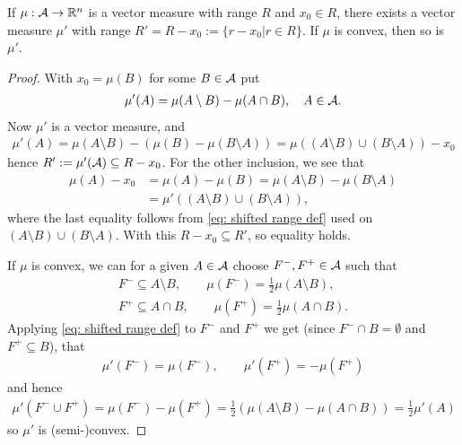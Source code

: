 \documentclass[../../main.tex]{subfiles}
\begin{document}
\begin{lemma}\label{lem: shifted measure}
If $\mu:\mathcal{A} \to \mathbb{R}^{n}$ is a vector measure with range $R$ and $x_{0}\in R$, there exists a vector measure $\mu'$ with range $R'=R-x_{0}:=\{r-x_{0} | r\in R\}$. If $\mu$ is convex, then so is $\mu'$.
\end{lemma}
\begin{proof}
With $x_{0}=\mu(B)$ for some $B\in \mathcal{A}$ put
\begin{align}
	\mu'(A)=\mu(A\setminus B) - \mu(A\cap B), \quad A\in \mathcal{A}. \label{eq: shifted range def}
\end{align}
Now $\mu'$ is a vector measure, and
\begin{align*}
	\mu'(A)=\mu(A\setminus B) - (\mu(B) - \mu(B\setminus A)) = \mu((A\setminus B) \cup (B\setminus A)) - x_{0}
\end{align*}
hence $R':=\mu'(\mathcal{A})\subseteq R-x_{0}$. For the other inclusion, we see that
\begin{align*}
	\mu(A)-x_{0}&=\mu(A)-\mu(B)=\mu(A\setminus B) - \mu(B\setminus A) \\
	&=\mu'((A\setminus B) \cup (B\setminus A)),
\end{align*}
where the last equality follows from \eqref{eq: shifted range def} used on $(A\setminus B) \cup (B\setminus A)$. With this $R-x_{0}\subseteq R'$, so equality holds.

If $\mu$ is convex, we can for a given $A\in \mathcal{A}$ choose $F^{-}, F^{+}\in \mathcal{A}$ such that
\begin{align*}
	F^{-}\subseteq A\setminus B, \qquad \mu(F^{-})=\frac{1}{2}\mu(A\setminus B), \\
	F^{+}\subseteq A\cap B, \qquad \mu(F^{+})=\frac{1}{2}\mu(A\cap B).
\end{align*}
Applying \eqref{eq: shifted range def} to $F^{-}$ and $F^{+}$ we get (since $F^{-}\cap B=\emptyset$ and $F^{+}\subseteq B$), that
\begin{align*}
	\mu'(F^{-})=\mu(F^{-}), \qquad \mu'(F^{+})=-\mu(F^{+})
\end{align*}
and hence
\begin{align*}
	\mu'(F^{-}\cup F^{+})=\mu(F^{-})-\mu(F^{+})=\frac{1}{2}(\mu(A\setminus B) - \mu(A\cap B))=\frac{1}{2}\mu'(A)
\end{align*}
so $\mu'$ is (semi-)convex.
\end{proof}
\end{document}
